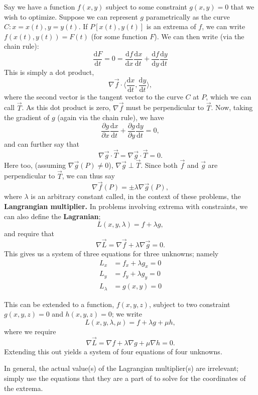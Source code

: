 \documentclass[12pt]{article}
\begin{document}
{Say we have a function $f(x,y)$ subject to some constraint $g(x,y) = 0$ that we wish to optimize. Suppose we can represent $g$ parametrically as the curve $C: x = x(t), y = y(t)$. If $P[x(t), y(t)]$ is an extrema of $f$, we can write $f(x(t), y(t)) = F(t)$ (for some function $F$). We can then write (via the chain rule): \[\frac{\text{d}F}{\text{d}t} = 0 = \frac{\text{d}f}{\text{d}x} \frac{\text{d}x}{\text{d}t} + \frac{\text{d}f}{\text{d}y}\frac{\text{d}y}{\text{d}t}\] This is simply a dot product, \[\nabla \vec{f} \cdot \langle \frac{\text{d}x}{\text{d}t}, \frac{\text{d}y}{\text{d}t} \rangle, \] where the second vector is the tangent vector to the curve $C$ at $P$, which we can call $\vec{T}$. As this dot product is zero, $\nabla \vec{f}$ must be perpendicular to $\vec{T}$. Now, taking the gradient of $g$ (again via the chain rule), we have \[\frac{\partial g}{\partial x} \frac{\text{d}x}{\text{d}t} + \frac{\partial g}{\partial y} \frac{\text{d}y}{\text{d}t} = 0,\] and can further say that \[\nabla \vec{g} \cdot \vec{T}= \nabla \vec{g} \cdot \vec{T} = 0 .\] Here too, (assuming $\nabla \vec{g}(P) \neq 0$), $\nabla \vec{g} \perp \vec{T}$. Since both $\vec{f}$ and $\vec{g}$ are perpendicular to $\vec{T}$, we can thus say \[\nabla \vec{f}(P) = \pm \lambda \nabla \vec{g}(P),\] where $\lambda$ is an arbitrary constant called, in the context of these problems, the \textbf{Langrangian multiplier.} In problems involving extrema with constraints, we can also define the \textbf{Lagranian}; \[L(x,y, \lambda) = f + \lambda g,\] and require that \[\nabla \vec{L} = \nabla \vec{f}  + \lambda \nabla \vec{g} = 0.\] This gives us a system of three equations for three unknowns; namely \begin{align*}
    L_x &= f_x + \lambda g_x = 0\\
    L_y &= f_y + \lambda g_y = 0\\
    L_{\lambda} &= g(x,y) = 0
\end{align*}

This can be extended to a function, $f(x,y,z)$, subject to two constraint $g(x,y,z) = 0$ and $h(x,y,z) = 0$; we write \[L(x,y,\lambda, \mu) = f + \lambda g + \mu h,\] where we require \[\nabla \vec{L} = \nabla f + \lambda \nabla g + \mu \nabla h = 0.\] Extending this out yields a system of four equations of four unknowns.

In general, the actual value(s) of the Lagrangian multiplier(s) are irrelevant; simply use the equations that they are a part of to solve for the coordinates of the extrema.

}
\end{document}
